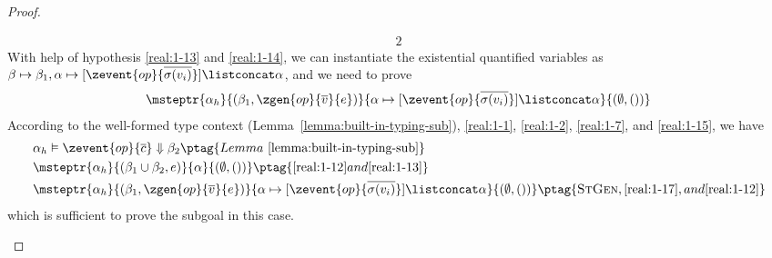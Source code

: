 \begin{proof}
\begin{enumerate}[label=Case]
{\begin{alignat}{2}
\end{alignat}}\noindent
With help of hypothesis \ref{real:1-13} and \ref{real:1-14}, we can instantiate the existential quantified variables as $\beta \mapsto \beta_1, \alpha \mapsto [\zevent{op}{\overline{\sigma(v_i)}}] \listconcat \alpha$, and we need to prove
{\footnotesize\begin{align*}
    \msteptr{\alpha_h}{(\beta_1, \zgen{op}{\overline{v}}{e})}{ \alpha \mapsto [\zevent{op}{\overline{\sigma(v_i)}}] \listconcat \alpha}{(\emptyset, ())}
\end{align*}}\noindent
According to the well-formed type context (Lemma~\ref{lemma:built-in-typing-sub}), \ref{real:1-1}, \ref{real:1-2}, \ref{real:1-7}, and \ref{real:1-15}, we have
{\footnotesize\begin{alignat}{2}
& \alpha_h \vDash \zevent{op}{\overline{c}} \Downarrow \beta_2 \ptag{Lemma~\ref{lemma:built-in-typing-sub}} \label{real:1-16}
\\& \msteptr{\alpha_h}{(\beta_1 \cup \beta_2, e)}{\alpha}{(\emptyset, ())} \ptag{ \ref{real:1-12} and \ref{real:1-13}} \label{real:1-17}
\\& \msteptr{\alpha_h}{(\beta_1, \zgen{op}{\overline{v}}{e})}{ \alpha \mapsto [\zevent{op}{\overline{\sigma(v_i)}}] \listconcat \alpha}{(\emptyset, ())} \ptag{\textsc{StGen}, \ref{real:1-17}, and \ref{real:1-12}} \label{real:1-18}
\end{alignat}}\noindent
which is sufficient to prove the subgoal in this case.


\end{enumerate}
\end{proof}
